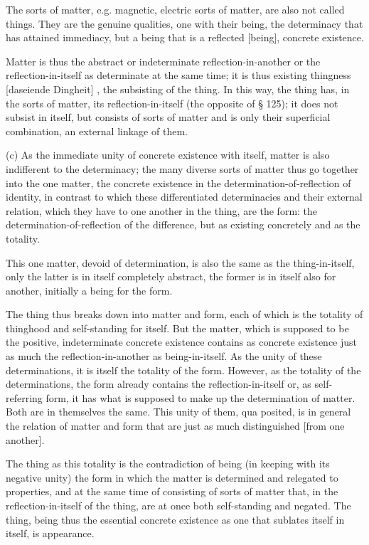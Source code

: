     The sorts of matter, e.g. magnetic, electric sorts of matter, are also
    not called things. They are the genuine qualities, one with their being,
    the determinacy that has attained immediacy,
    but a being that is a reflected [being], concrete existence.

Matter is thus the abstract or indeterminate reflection-in-another or the
reflection-in-itself as determinate at the same time; it is thus existing thingness
[daseiende Dingheit] , the subsisting of the thing. In this way, the thing has,
in the sorts of matter, its reflection-in-itself (the opposite of § 125); it does
not subsist in itself, but consists of sorts of matter and is only their superficial
combination, an external linkage of them.

(c) As the immediate unity of concrete existence with itself,
matter is also indifferent to the determinacy;
the many diverse sorts of matter thus go together into
the one matter, the concrete existence in
the determination-of-reflection of identity,
in contrast to which these differentiated determinacies and
their external relation, which they have to one another in the thing,
are the form:
the determination-of-reflection of the difference,
but as existing concretely and as the totality.

    This one matter, devoid of determination, is also the same as
    the thing-in-itself, only the latter is in itself completely abstract,
    the former is in itself also for another, initially a being for the form.

The thing thus breaks down into matter and form,
each of which is the totality of thinghood and
self-standing for itself.
But the matter, which is supposed to be the positive,
indeterminate concrete existence contains as concrete existence
just as much the reflection-in-another as being-in-itself.
As the unity of these determinations,
it is itself the totality of the form.
However, as the totality of the determinations,
the form already contains the reflection-in-itself or,
as self-referring form, it has what is supposed to
make up the determination of matter.
Both are in themselves the same.
This unity of them, qua posited, is in general
the relation of matter and form that are
just as much distinguished [from one another].

The thing as this totality is the contradiction of being
(in keeping with its negative unity)
the form in which the matter is determined and relegated to properties, and
at the same time of consisting of sorts of matter that,
in the reflection-in-itself of the thing, are
at once both self-standing and negated.
The thing, being thus the essential concrete existence
as one that sublates itself in itself, is appearance.

